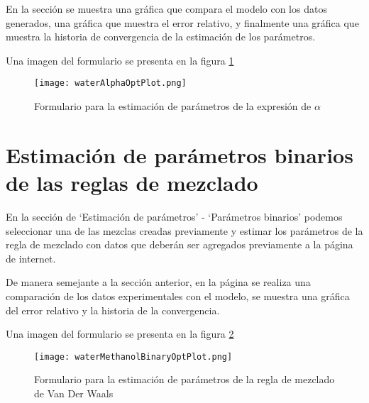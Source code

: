 	En la sección se muestra una gráfica que compara el modelo con los datos generados, una gráfica que muestra el error relativo, y finalmente una gráfica que muestra la historia de convergencia de la estimación de los parámetros.

	Una imagen del formulario se presenta en la figura \ref{fig:alphaOptim}

\begin{figure}[H]
	\texttt{[image: waterAlphaOptPlot.png]}
	\caption{Formulario para la estimación de parámetros de la expresión de $\alpha$}
	\label{fig:alphaOptim}
\end{figure}


\section{Estimación de parámetros binarios de las reglas de mezclado}\label{sec:webBinaryOptim}
	En la sección de `Estimación de parámetros' - `Parámetros binarios' podemos seleccionar una de las mezclas creadas previamente y estimar los parámetros de la regla de mezclado con datos que deberán ser agregados previamente a la página de internet.

	De manera semejante a la sección anterior, en la página se realiza una comparación de los datos experimentales con el modelo, se muestra una gráfica del error relativo y la historia de la convergencia.

	Una imagen del formulario se presenta en la figura \ref{fig:binaryOptim}
\begin{figure}[H]
	\texttt{[image: waterMethanolBinaryOptPlot.png]}
	\caption{Formulario para la estimación de parámetros de la regla de mezclado de Van Der Waals}
	\label{fig:binaryOptim}
\end{figure}
